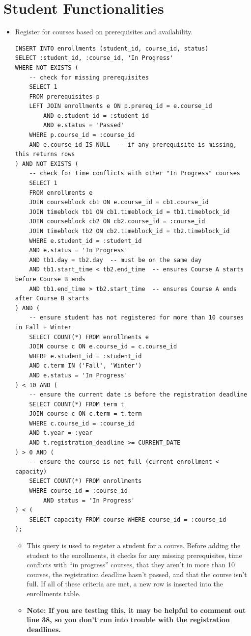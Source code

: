 \documentclass{report}
\newcommand{\usection}[1]{\section*{#1}
\addcontentsline{toc}{section}{\protect\numberline{}#1}}
\begin{document}
\usection{Student Functionalities}

\begin{itemize}
    
    \item Register for courses based on prerequisites and availability.
    \begin{lstlisting}
INSERT INTO enrollments (student_id, course_id, status)
SELECT :student_id, :course_id, 'In Progress'
WHERE NOT EXISTS (
    -- check for missing prerequisites
    SELECT 1
    FROM prerequisites p
    LEFT JOIN enrollments e ON p.prereq_id = e.course_id
        AND e.student_id = :student_id
        AND e.status = 'Passed'
    WHERE p.course_id = :course_id
    AND e.course_id IS NULL  -- if any prerequisite is missing, this returns rows
) AND NOT EXISTS (
    -- check for time conflicts with other "In Progress" courses
    SELECT 1
    FROM enrollments e
    JOIN courseblock cb1 ON e.course_id = cb1.course_id
    JOIN timeblock tb1 ON cb1.timeblock_id = tb1.timeblock_id
    JOIN courseblock cb2 ON cb2.course_id = :course_id
    JOIN timeblock tb2 ON cb2.timeblock_id = tb2.timeblock_id
    WHERE e.student_id = :student_id
    AND e.status = 'In Progress'
    AND tb1.day = tb2.day  -- must be on the same day
    AND tb1.start_time < tb2.end_time  -- ensures Course A starts before Course B ends
    AND tb1.end_time > tb2.start_time  -- ensures Course A ends after Course B starts
) AND (
    -- ensure student has not registered for more than 10 courses in Fall + Winter
    SELECT COUNT(*) FROM enrollments e
    JOIN course c ON e.course_id = c.course_id
    WHERE e.student_id = :student_id
    AND c.term IN ('Fall', 'Winter')
    AND e.status = 'In Progress'
) < 10 AND (
    -- ensure the current date is before the registration deadline
    SELECT COUNT(*) FROM term t
    JOIN course c ON c.term = t.term
    WHERE c.course_id = :course_id
    AND t.year = :year
    AND t.registration_deadline >= CURRENT_DATE
) > 0 AND (
    -- ensure the course is not full (current enrollment < capacity)
    SELECT COUNT(*) FROM enrollments
    WHERE course_id = :course_id
        AND status = 'In Progress'
) < (
    SELECT capacity FROM course WHERE course_id = :course_id
);
    \end{lstlisting}
    \begin{itemize}
        \item This query is used to register a student for a course. Before adding the student to the enrollments, it checks for any missing prerequisites, time conflicts with ``in progress'' courses, that they aren't in more than 10 courses, the registration deadline hasn't passed, and that the course isn't full. If all of these criteria are met, a new row is inserted into the enrollments table.
        \item \textbf{Note: If you are testing this, it may be helpful to comment out line 38, so you don't run into trouble with the registration deadlines.}
    \end{itemize}
    

\end{itemize}
\end{document}
